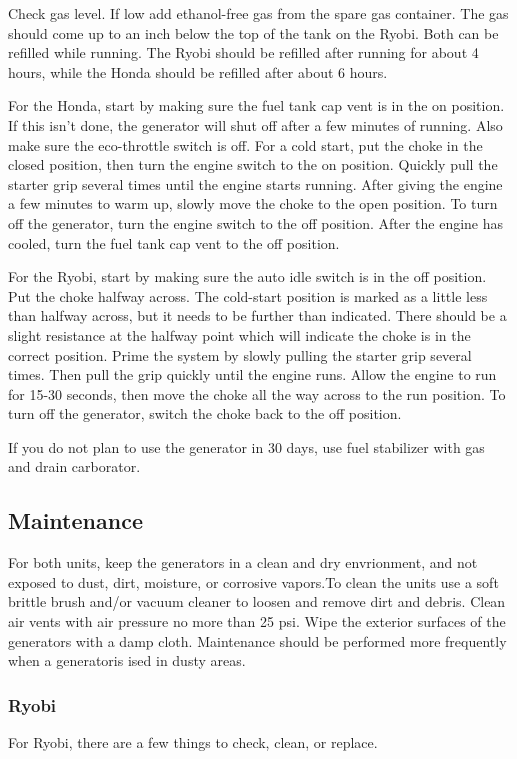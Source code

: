 \documentclass[12pt]{../SOP3_beta}
\begin{document}
\NP Check gas level. If low add ethanol-free gas from the spare gas container. The gas should come up to an inch below the top of the tank on the Ryobi. Both can be refilled while running. The Ryobi should be refilled after running for about 4 hours, while the Honda should be refilled after about 6 hours. 

\NP For the Honda, start by making sure the fuel tank cap vent is in the on position. If this isn't done, the generator will shut off after a few minutes of running. Also make sure the eco-throttle switch is off. For a cold start, put the choke in the closed position, then turn the engine switch to the on position. 
  Quickly pull the starter grip several times until the engine starts running. After giving the engine a few minutes to warm up, slowly move the choke to the open position.
  To turn off the generator, turn the engine switch to the off position. After the engine has cooled, turn the fuel tank cap vent to the off position. 

\NP For the Ryobi, start by making sure the auto idle switch is in the off position. Put the choke halfway across. The cold-start position is marked as a little less than halfway across, but it needs to be further than indicated. There should be a slight resistance at the halfway point which will indicate the choke is in the correct position.
  Prime the system by slowly pulling the starter grip several times. Then pull the grip quickly until the engine runs. Allow the engine to run for 15-30 seconds, then move the choke all the way across to the run position.
  To turn off the generator, switch the choke back to the off position.

\NP If you do not plan to use the generator in 30 days, use fuel stabilizer with gas and drain carborator. 

\subsection{Maintenance}

\NP For both units, keep the generators in a clean and dry envrionment, and not exposed to dust, dirt, moisture, or corrosive vapors.To clean the units use a soft brittle brush and/or vacuum cleaner to loosen and remove dirt and debris. Clean air vents with air pressure no more than 25 psi. Wipe the exterior surfaces of the generators with a damp cloth. Maintenance should be performed more frequently when a generatoris ised in dusty areas.

\subsubsection{Ryobi}
\NP For Ryobi, there are a few things to check, clean, or replace.
\end{document}
